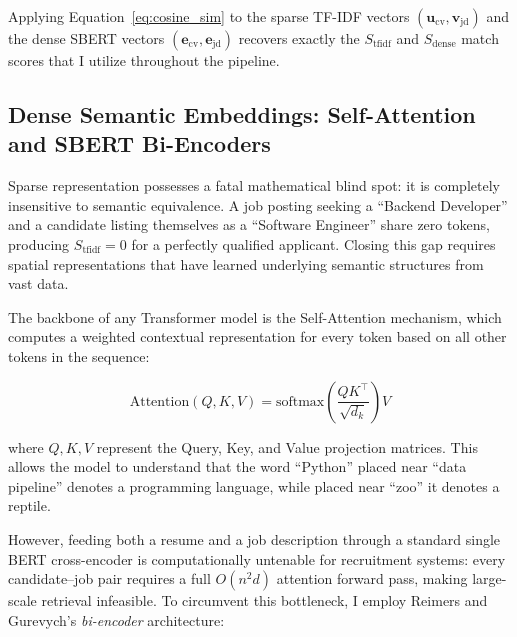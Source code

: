 Applying Equation~\eqref{eq:cosine_sim} to the sparse TF-IDF vectors $(\mathbf{u}_{\text{cv}}, \mathbf{v}_{\text{jd}})$ and the dense SBERT vectors $(\mathbf{e}_{\text{cv}}, \mathbf{e}_{\text{jd}})$ recovers exactly the $S_{\text{tfidf}}$ and $S_{\text{dense}}$ match scores that I utilize throughout the pipeline.

\subsection{Dense Semantic Embeddings: Self-Attention and SBERT Bi-Encoders}
\label{subsec:sbert}

Sparse representation possesses a fatal mathematical blind spot: it is completely insensitive to semantic equivalence. A job posting seeking a ``Backend Developer'' and a candidate listing themselves as a ``Software Engineer'' share zero tokens, producing $S_{\text{tfidf}} = 0$ for a perfectly qualified applicant. Closing this gap requires spatial representations that have learned underlying semantic structures from vast data.

The backbone of any Transformer model is the Self-Attention mechanism, which computes a weighted contextual representation for every token based on all other tokens in the sequence:

\begin{equation}
\text{Attention}(Q, K, V) = \text{softmax}\!\left(\frac{Q K^\top}{\sqrt{d_k}}\right)\!V
\label{eq:attention}
\end{equation}
\vspace{0.5em}

where $Q, K, V$ represent the Query, Key, and Value projection matrices. This allows the model to understand that the word ``Python'' placed near ``data pipeline'' denotes a programming language, while placed near ``zoo'' it denotes a reptile.

However, feeding both a resume and a job description through a standard single BERT cross-encoder is computationally untenable for recruitment systems: every candidate--job pair requires a full $O(n^2 d)$ attention forward pass, making large-scale retrieval infeasible. To circumvent this bottleneck, I employ Reimers and Gurevych's \emph{bi-encoder} architecture:

